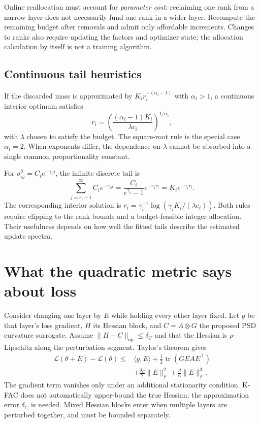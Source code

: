 \documentclass[11pt]{article}
\newcommand{\tr}{\operatorname{tr}}
\begin{document}
Online reallocation must account for \emph{parameter cost}: reclaiming one rank
from a narrow layer does not necessarily fund one rank in a wider layer.
Recompute the remaining budget after removals and admit only affordable
increments. Changes to ranks also require updating the factors and optimizer
state; the allocation calculation by itself is not a training algorithm.

\subsection{Continuous tail heuristics}

If the discarded mass is approximated by
$K_i r_i^{-(\alpha_i-1)}$ with $\alpha_i>1$, a continuous interior optimum
satisfies
\[
 r_i=\left(\frac{(\alpha_i-1)K_i}{\lambda c_i}\right)^{1/\alpha_i},
\]
with $\lambda$ chosen to satisfy the budget. The square-root rule is the
special case $\alpha_i=2$. When exponents differ, the dependence on $\lambda$
cannot be absorbed into a single common proportionality constant.

For $\sigma_{ij}^2=C_i e^{-\gamma_i j}$, the infinite discrete tail is
\[
 \sum_{j=r_i+1}^{\infty} C_i e^{-\gamma_i j}
 =\frac{C_i}{e^{\gamma_i}-1}e^{-\gamma_i r_i}
 =K_i e^{-\gamma_i r_i}.
\]
The corresponding interior solution is
$r_i=\gamma_i^{-1}\log(\gamma_i K_i/(\lambda c_i))$.
Both rules require clipping to the rank bounds and a budget-feasible integer
allocation. Their usefulness depends on how well the fitted tails describe the
estimated update spectra.

\section{What the quadratic metric says about loss}

Consider changing one layer by $E$ while holding every other layer fixed.
Let $g$ be that layer's loss gradient, $H$ its Hessian block, and
$C=A\otimes G$ the proposed PSD curvature surrogate. Assume
$\|H-C\|_{\mathrm{op}}\leq\delta_C$ and that the Hessian is
$\rho$-Lipschitz along the perturbation segment. Taylor's theorem gives
\[
\begin{split}
 \mathcal L(\theta+E)-\mathcal L(\theta)
 \leq{}&\langle g,E\rangle
 +\tfrac12\tr(GEA E^\top)\\
 &+\tfrac{\delta_C}{2}\|E\|_F^2+\tfrac{\rho}{6}\|E\|_F^3.
\end{split}
\]
The gradient term vanishes only under an additional stationarity condition.
K-FAC does not automatically upper-bound the true Hessian; the approximation
error $\delta_C$ is needed. Mixed Hessian blocks enter when multiple layers are
perturbed together, and must be bounded separately.
\end{document}
